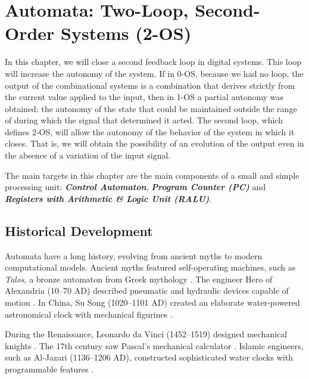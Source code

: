 \chapter{Automata: Two-Loop, Second-Order Systems (2-OS)}\label{lect3}
\localtoc

In this chapter, we will close a second feedback loop in digital systems. This loop will increase the autonomy of the system. If in 0-OS, because we had no loop, the output of the combinational systems is a combination that derives strictly from the current value applied to the input, then in 1-OS a partial autonomy was obtained: the autonomy of the state that could be maintained outside the range of during which the signal that determined it acted. The second loop, which defines 2-OS, will allow the autonomy of the behavior of the system in which it closes. That is, we will obtain the possibility of an evolution of the output even in the absence of a variation of the input signal.

The main targets in this chapter are the main components of a small and simple processing unit: {\bf {\em Control Automaton}}, {\bf {\em Program Counter (PC)}} and  {\bf {\em Registers with Arithmetic \& Logic Unit (RALU)}}.

\section{Historical Development}
Automata have a long history, evolving from ancient myths to modern computational models. Ancient myths featured self-operating machines, such as \textit{Talos}, a bronze automaton from Greek mythology \cite{bedini1964early}. The engineer Hero of Alexandria (10–70 AD) described pneumatic and hydraulic devices capable of motion \cite{hero1899pneumatics}. In China, Su Song (1020–1101 AD) created an elaborate water-powered astronomical clock with mechanical figurines \cite{needham1986science}.

During the Renaissance, Leonardo da Vinci (1452–1519) designed mechanical knights \cite{rosheim2006leonardo}. The 17th century saw Pascal's mechanical calculator \cite{pascal1665arithmetical}. Islamic engineers, such as Al-Jazari (1136–1206 AD), constructed sophisticated water clocks with programmable features \cite{aljazari1974}.

